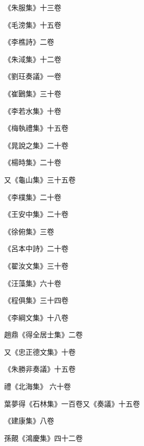 \begin{pinyinscope}
 《朱服集》十三卷



 《毛滂集》十五卷



 《李樵詩》二卷



 《朱淢集》十二卷



 《劉玨奏議》一卷



 《崔鶠集》三十卷



 《李若水集》十卷



 《梅執禮集》十五卷



 《晁說之集》二十卷



 《楊時集》二十卷



 又《龜山集》三十五卷



 《李樸集》二十卷



 《王安中集》二十卷



 《徐俯集》三卷



 《呂本中詩》二十卷



 《翟汝文集》三十卷



 《汪藻集》六十卷



 《程俱集》三十四卷



 《李綱文集》十八卷



 趙鼎《得全居士集》二卷



 又《忠正德文集》十卷



 《朱勝非奏議》十五卷



 禮《北海集》
 六十卷



 葉夢得《石林集》一百卷又《奏議》十五卷



 《建康集》八卷



 孫覿《鴻慶集》四十二卷




\end{pinyinscope}
